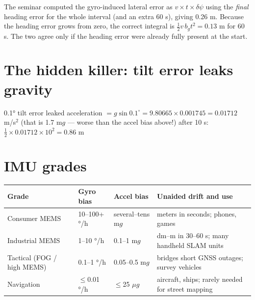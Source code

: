 \begin{improve}
The seminar computed the gyro-induced lateral error as $v\times t\times\delta\psi$ using the \emph{final} heading error for the whole interval (and an extra 60 s), giving 0.26 m. Because the heading error grows from zero, the correct integral is $\tfrac12 v\,b_g t^2=0.13$ m for 60 s. The two agree only if the heading error were already fully present at the start.
\end{improve}


\section{The hidden killer: tilt error leaks gravity}

\begin{worked}{0.1° tilt error}
 leaked acceleration $=g\sin0.1^\circ=9.80665\times0.001745=0.01712$ m/s$^2$ (that is 1.7 m$g$ --- worse than the accel bias above!)
 after 10 s: $\tfrac12\times0.01712\times10^2=0.86$ m
\end{worked}

\section{IMU grades}

\begin{center}\small
\renewcommand{\arraystretch}{1.2}
\begin{tabularx}{\linewidth}{lllX}\toprule
\textbf{Grade} & \textbf{Gyro bias} & \textbf{Accel bias} & \textbf{Unaided drift and use}\\\midrule
Consumer MEMS & 10--100+ °/h & several--tens m$g$ & meters in seconds; phones, games\\
Industrial MEMS & 1--10 °/h & 0.1--1 m$g$ & dm--m in 30--60 s; many handheld SLAM units\\
Tactical (FOG / high MEMS) & 0.1--1 °/h & 0.05--0.5 m$g$ & bridges short GNSS outages; survey vehicles\\
Navigation & $\le$0.01 °/h & $\le$25 $\mu g$ & aircraft, ships; rarely needed for street mapping\\\bottomrule
\end{tabularx}\end{center}

